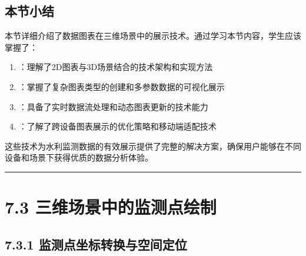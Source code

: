 \hypertarget{ux672cux8282ux5c0fux7ed3-1}{%
\subsection{本节小结}\label{ux672cux8282ux5c0fux7ed3-1}}

本节详细介绍了数据图表在三维场景中的展示技术。通过学习本节内容，学生应该掌握了：

\begin{enumerate}
\def\labelenumi{\arabic{enumi}.}
\tightlist
\item
  ：理解了2D图表与3D场景结合的技术架构和实现方法
\item
  ：掌握了复杂图表类型的创建和多参数数据的可视化展示
\item
  ：具备了实时数据流处理和动态图表更新的技术能力
\item
  ：了解了跨设备图表展示的优化策略和移动端适配技术
\end{enumerate}

这些技术为水利监测数据的有效展示提供了完整的解决方案，确保用户能够在不同设备和场景下获得优质的数据分析体验。

\begin{center}\rule{0.5\linewidth}{0.5pt}\end{center}


\hypertarget{ux4e09ux7ef4ux573aux666fux4e2dux7684ux76d1ux6d4bux70b9ux7ed8ux5236}{%
\section{7.3 三维场景中的监测点绘制}\label{ux4e09ux7ef4ux573aux666fux4e2dux7684ux76d1ux6d4bux70b9ux7ed8ux5236}}


\hypertarget{ux76d1ux6d4bux70b9ux5750ux6807ux8f6cux6362ux4e0eux7a7aux95f4ux5b9aux4f4d}{%
\subsection{7.3.1 监测点坐标转换与空间定位}\label{ux76d1ux6d4bux70b9ux5750ux6807ux8f6cux6362ux4e0eux7a7aux95f4ux5b9aux4f4d}}

